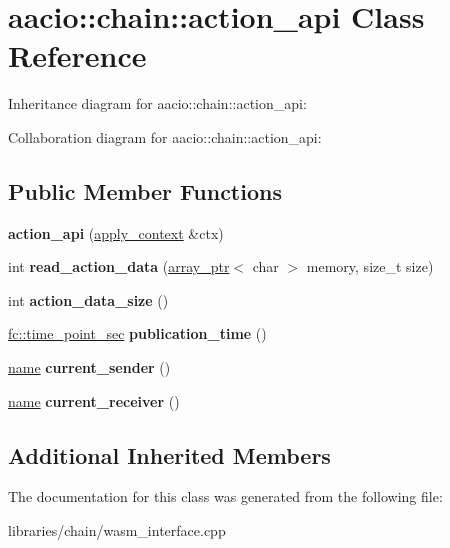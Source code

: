 \hypertarget{classaacio_1_1chain_1_1action__api}{}\section{aacio\+:\+:chain\+:\+:action\+\_\+api Class Reference}
\label{classaacio_1_1chain_1_1action__api}


Inheritance diagram for aacio\+:\+:chain\+:\+:action\+\_\+api\+:


Collaboration diagram for aacio\+:\+:chain\+:\+:action\+\_\+api\+:
\subsection*{Public Member Functions}
\begin{DoxyCompactItemize}
\item 
\mbox{\label{classaacio_1_1chain_1_1action__api_af98dc1373cae987c95391cb2a2a73a4e}} 
{\bfseries action\+\_\+api} (\mbox{\hyperlink{classaacio_1_1chain_1_1apply__context}{apply\+\_\+context}} \&ctx)
\item 
\mbox{\label{classaacio_1_1chain_1_1action__api_a87e0cb4b85626a1c919e7a383278b9b6}} 
int {\bfseries read\+\_\+action\+\_\+data} (\mbox{\hyperlink{structaacio_1_1chain_1_1array__ptr}{array\+\_\+ptr}}$<$ char $>$ memory, size\+\_\+t size)
\item 
\mbox{\label{classaacio_1_1chain_1_1action__api_a803522b49df9791f1007420ff5b8e537}} 
int {\bfseries action\+\_\+data\+\_\+size} ()
\item 
\mbox{\label{classaacio_1_1chain_1_1action__api_a86d670dbee236ea431f2774295961515}} 
\mbox{\hyperlink{classfc_1_1time__point__sec}{fc\+::time\+\_\+point\+\_\+sec}} {\bfseries publication\+\_\+time} ()
\item 
\mbox{\label{classaacio_1_1chain_1_1action__api_a9d11ae58e2ac8c7a0188e7770e49dbb0}} 
\mbox{\hyperlink{structaacio_1_1chain_1_1name}{name}} {\bfseries current\+\_\+sender} ()
\item 
\mbox{\label{classaacio_1_1chain_1_1action__api_a77a4a7d09f0af325a47e4bf1624d037b}} 
\mbox{\hyperlink{structaacio_1_1chain_1_1name}{name}} {\bfseries current\+\_\+receiver} ()
\end{DoxyCompactItemize}
\subsection*{Additional Inherited Members}


The documentation for this class was generated from the following file\+:\begin{DoxyCompactItemize}
\item 
libraries/chain/wasm\+\_\+interface.\+cpp\end{DoxyCompactItemize}
